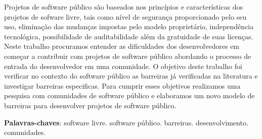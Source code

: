 \begin{resumo}
 
Projetos de software público são baseados nos princípios e características dos projetos de 
sofware livre, tais como nível de segurança proporcionado pelo seu uso, eliminação das mudanças
impostas pelo modelo proprietário, independência tecnológica, possibilidade de
auditabilidade além da gratuidade de suas licenças.
%
Neste trabalho procuramos entender as dificuldades dos desenvolvedores em começar a 
contribuir com projetos de software público abordando o processo de 
entrada do desenvolvedor em uma comunidade.
%
O objetivo deste trabalho foi verificar no contexto do software público as barreiras 
já verificadas na literatura e investigar barreiras especificas. 
%
Para cumprir esses objetivos realizamos uma pesquisa com comunidades de software
público e elaboramos um novo modelo de barreiras para desenvolver projetos de 
software público. 
 \vspace{\onelineskip}
    
 \noindent
 \textbf{Palavras-chaves}: software livre. software público. barreiras. desenvolvimento. comunidades.
\end{resumo}
